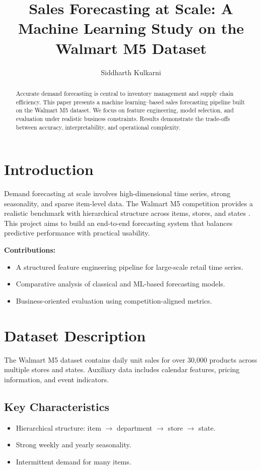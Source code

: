 \documentclass{article}
\title{Sales Forecasting at Scale: A Machine Learning Study on the Walmart M5 Dataset}
\author{Siddharth Kulkarni}
\date{}
\begin{document}
\maketitle

\begin{abstract}
Accurate demand forecasting is central to inventory management and supply chain efficiency.
This paper presents a machine learning–based sales forecasting pipeline built on the Walmart M5 dataset.
We focus on feature engineering, model selection, and evaluation under realistic business constraints.
Results demonstrate the trade-offs between accuracy, interpretability, and operational complexity.
\end{abstract}

\section{Introduction}
Demand forecasting at scale involves high-dimensional time series, strong seasonality, and sparse item-level data.
The Walmart M5 competition provides a realistic benchmark with hierarchical structure across items, stores, and states \cite{makridakis2022m5}.
This project aims to build an end-to-end forecasting system that balances predictive performance with practical usability.

\textbf{Contributions:}
\begin{itemize}[leftmargin=*]
    \item A structured feature engineering pipeline for large-scale retail time series.
    \item Comparative analysis of classical and ML-based forecasting models.
    \item Business-oriented evaluation using competition-aligned metrics.
\end{itemize}

\section{Dataset Description}
The Walmart M5 dataset contains daily unit sales for over 30,000 products across multiple stores and states.
Auxiliary data includes calendar features, pricing information, and event indicators.

\subsection{Key Characteristics}
\begin{itemize}[leftmargin=*]
    \item Hierarchical structure: item $\rightarrow$ department $\rightarrow$ store $\rightarrow$ state.
    \item Strong weekly and yearly seasonality.
    \item Intermittent demand for many items.
\end{itemize}
\end{document}
